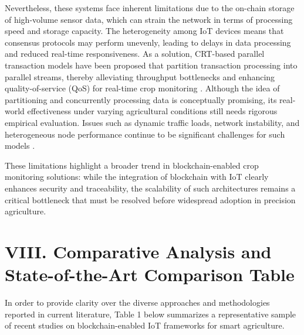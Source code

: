 \documentclass[12pt,onecolumn]{IEEEtran} %
\begin{document}
Nevertheless, these systems face inherent limitations due to the on-chain storage of high-volume sensor data, which can strain the network in terms of processing speed and storage capacity. The heterogeneity among IoT devices means that consensus protocols may perform unevenly, leading to delays in data processing and reduced real-time responsiveness. As a solution, CRT-based parallel transaction models have been proposed that partition transaction processing into parallel streams, thereby alleviating throughput bottlenecks and enhancing quality-of-service (QoS) for real-time crop monitoring \cite{ali2022blockchainenabledarchitecture}. Although the idea of partitioning and concurrently processing data is conceptually promising, its real-world effectiveness under varying agricultural conditions still needs rigorous empirical evaluation. Issues such as dynamic traffic loads, network instability, and heterogeneous node performance continue to be significant challenges for such models \cite{ali2022blockchainenabledarchitecture}.

These limitations highlight a broader trend in blockchain-enabled crop monitoring solutions: while the integration of blockchain with IoT clearly enhances security and traceability, the scalability of such architectures remains a critical bottleneck that must be resolved before widespread adoption in precision agriculture.

\section*{VIII. Comparative Analysis and State-of-the-Art Comparison Table}

In order to provide clarity over the diverse approaches and methodologies reported in current literature, Table 1 below summarizes a representative sample of recent studies on blockchain-enabled IoT frameworks for smart agriculture.
\end{document}
